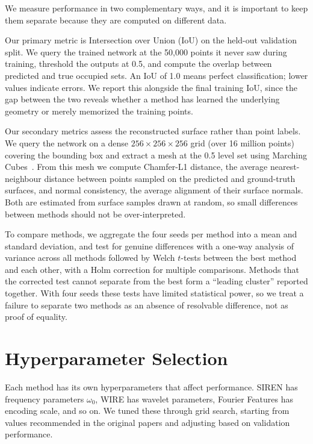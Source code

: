We measure performance in two complementary ways, and it is important to keep them separate because they are computed on different data.

Our primary metric is Intersection over Union (IoU) on the held-out validation split. We query the trained network at the 50,000 points it never saw during training, threshold the outputs at 0.5, and compute the overlap between predicted and true occupied sets. An IoU of 1.0 means perfect classification; lower values indicate errors. We report this alongside the final training IoU, since the gap between the two reveals whether a method has learned the underlying geometry or merely memorized the training points.

Our secondary metrics assess the reconstructed surface rather than point labels. We query the network on a dense $256 \times 256 \times 256$ grid (over 16 million points) covering the bounding box and extract a mesh at the 0.5 level set using Marching Cubes~\cite{lorensen1987marching}. From this mesh we compute Chamfer-L1 distance, the average nearest-neighbour distance between points sampled on the predicted and ground-truth surfaces, and normal consistency, the average alignment of their surface normals. Both are estimated from surface samples drawn at random, so small differences between methods should not be over-interpreted.

To compare methods, we aggregate the four seeds per method into a mean and standard deviation, and test for genuine differences with a one-way analysis of variance across all methods followed by Welch $t$-tests between the best method and each other, with a Holm correction for multiple comparisons. Methods that the corrected test cannot separate from the best form a ``leading cluster'' reported together. With four seeds these tests have limited statistical power, so we treat a failure to separate two methods as an absence of resolvable difference, not as proof of equality.

\section{Hyperparameter Selection}

Each method has its own hyperparameters that affect performance. SIREN has frequency parameters $\omega_0$, WIRE has wavelet parameters, Fourier Features has encoding scale, and so on. We tuned these through grid search, starting from values recommended in the original papers and adjusting based on validation performance.

